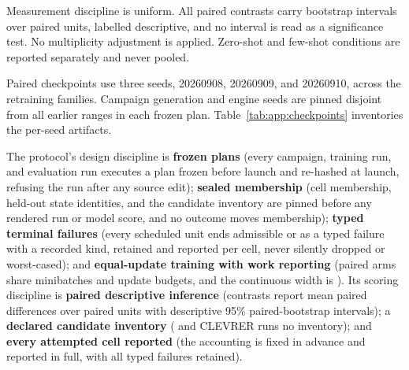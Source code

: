 Measurement discipline is uniform. All paired contrasts carry bootstrap intervals over paired units, labelled descriptive, and no interval is read as a significance test. No multiplicity adjustment is applied. Zero-shot and few-shot conditions are reported separately and never pooled. 

Paired checkpoints use three seeds, 20260908, 20260909, and 20260910, across the retraining families. Campaign generation and engine seeds are pinned disjoint from all earlier ranges in each frozen plan.  Table~\ref{tab:app:checkpoints} inventories the per-seed artifacts.

The protocol's design discipline is \textbf{frozen plans} (every campaign, training run, and evaluation run executes a plan frozen before launch and re-hashed at launch, refusing the run after any source edit); \textbf{sealed membership} (cell membership, held-out state identities, and the candidate inventory are pinned before any rendered run or model score, and no outcome moves membership); \textbf{typed terminal failures} (every scheduled unit ends admissible or as a typed failure with a recorded kind, retained and reported per cell, never silently dropped or worst-cased); and \textbf{equal-update training with work reporting} (paired arms share minibatches and update budgets, and the continuous width is ). Its scoring discipline is \textbf{paired descriptive inference} (contrasts report mean paired differences over paired units with descriptive 95\% paired-bootstrap intervals); a \textbf{declared candidate inventory} ( and CLEVRER runs no inventory); and \textbf{every attempted cell reported} (the accounting is fixed in advance and reported in full, with all typed failures retained).

